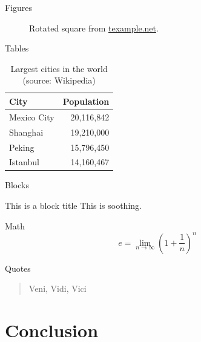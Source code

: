 \documentclass[10pt, compress]{beamer}
\begin{document}
\begin{frame}{Figures}
  \begin{figure}
    \caption{Rotated square from
    \href{http://www.texample.net/tikz/examples/rotated-polygons/}{texample.net}.}
  \end{figure}
\end{frame}
\begin{frame}{Tables}
  \begin{table}
    \caption{Largest cities in the world (source: Wikipedia)}
    \begin{tabular}{lr}
      \toprule
      City & Population\\
      \midrule
      Mexico City & 20,116,842\\
      Shanghai & 19,210,000\\
      Peking & 15,796,450\\
      Istanbul & 14,160,467\\
      \bottomrule
    \end{tabular}
  \end{table}
\end{frame}
\begin{frame}{Blocks}

  \begin{block}{This is a block title}
    This is soothing.
  \end{block}

\end{frame}
\begin{frame}{Math}
  \begin{equation*}
    e = \lim_{n\to \infty} \left(1 + \frac{1}{n}\right)^n
  \end{equation*}
\end{frame}
\begin{frame}{Quotes}
  \begin{quote}
    Veni, Vidi, Vici
  \end{quote}
\end{frame}


\section{Conclusion}
\end{document}
